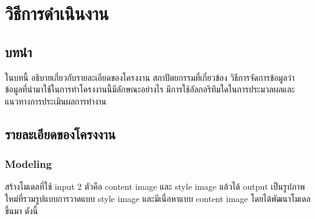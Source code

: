 \documentclass[12pt,oneside,openright,a4paper]{cpe-thai-project}
\begin{document}
\newpage





\chapter{วิธีการดำเนินงาน}
\section{บทนำ}
\par\setlength{\parindent}{5ex}
ในบทนี้ อธิบายเกี่ยวกับรายละเอียดของโครงงาน สถาปัตยกรรมที่เกี่ยวข้อง วิธีการจัดการข้อมูลว่า ข้อมูลที่นำมาใช้ในการทำโครงงานนี้มีลักษณะอย่างไร มีการใช้อัลกอริทึมใดในการประมวลผลและแนวทางการประเมินผลการทำงาน

\section{รายละเอียดของโครงงาน}
\subsection{Modeling}
\par\setlength{\parindent}{5ex}
สร้างโมเดลที่ใช้ input 2 ตัวคือ content image และ style image แล้วได้ output เป็นรูปภาพใหม่ที่รวมรูปแบบการวาดแบบ style image และมีเนื่อหาแบบ content image โดยได้พัฒนาโมเดลขึ้นมา ดังนี้
\end{document}
